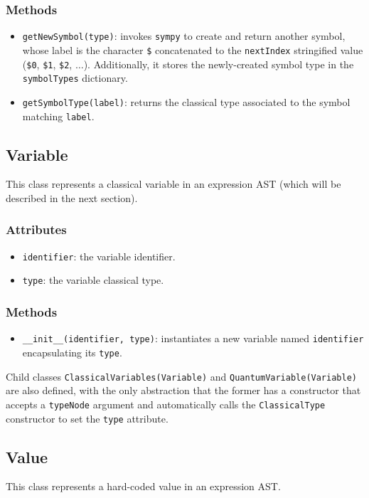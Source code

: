 \documentclass[12pt,a4paper]{report}
\theoremstyle{definition}
\theoremstyle{definition}
\theoremstyle{definition}
\begin{document}
\subsubsection{Methods}
\begin{itemize}
    \itemsep 0em
    \item \texttt{getNewSymbol(type)}: invokes \texttt{sympy} to create and return another symbol, whose label is the character \texttt{\$} concatenated to the \texttt{nextIndex} stringified value (\texttt{\$0}, \texttt{\$1}, \texttt{\$2}, $\ldots$). Additionally, it stores the newly-created symbol type in the \texttt{symbolTypes} dictionary.
    \item \texttt{getSymbolType(label)}: returns the classical type associated to the symbol matching \texttt{label}.
\end{itemize}

\pagebreak

\subsection{Variable}
This class represents a classical variable in an expression AST (which will be described in the next section).
\subsubsection{Attributes}
\begin{itemize}
    \itemsep 0em
    \item \texttt{identifier}: the variable identifier.
    \item \texttt{type}: the variable classical type.
\end{itemize}
\subsubsection{Methods}
\begin{itemize}
    \itemsep 0em
    \item \texttt{\_\_init\_\_(identifier, type)}: instantiates a new variable named \texttt{identifier} encapsulating its \texttt{type}.
\end{itemize}
Child classes \texttt{ClassicalVariables(Variable)} and \texttt{QuantumVariable(Variable)} are also defined, with the only abstraction that the former has a constructor that accepts a \texttt{typeNode} argument and automatically calls the \texttt{ClassicalType} constructor to set the \texttt{type} attribute.

\subsection{Value}
This class represents a hard-coded value in an expression AST.
\end{document}
